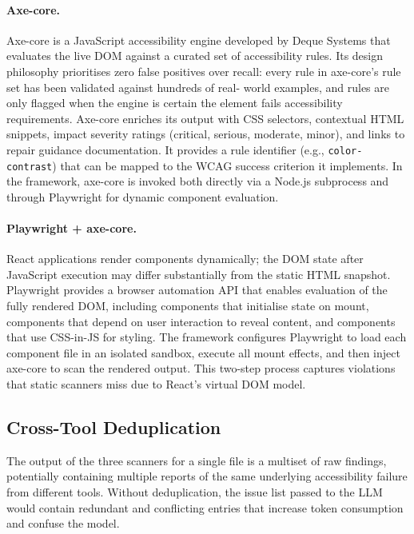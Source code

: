 \paragraph{Axe-core.}
Axe-core \cite{axe} is a JavaScript accessibility engine developed by Deque
Systems that evaluates the live DOM against a curated set of accessibility
rules.  Its design philosophy prioritises zero false positives over recall:
every rule in axe-core's rule set has been validated against hundreds of real-
world examples, and rules are only flagged when the engine is certain the
element fails accessibility requirements.  Axe-core enriches its output with
CSS selectors, contextual HTML snippets, impact severity ratings (critical,
serious, moderate, minor), and links to repair guidance documentation.  It
provides a rule identifier (e.g., \texttt{color-contrast}) that can be mapped
to the WCAG success criterion it implements.  In the framework, axe-core is
invoked both directly via a Node.js subprocess and through Playwright for
dynamic component evaluation.

\paragraph{Playwright + axe-core.}
React applications render components dynamically; the DOM state after
JavaScript execution may differ substantially from the static HTML snapshot.
Playwright \cite{playwright2023} provides a browser automation API that
enables evaluation of the fully rendered DOM, including components that
initialise state on mount, components that depend on user interaction to
reveal content, and components that use CSS-in-JS for styling.  The framework
configures Playwright to load each component file in an isolated sandbox,
execute all mount effects, and then inject axe-core to scan the rendered
output.  This two-step process captures violations that static scanners miss
due to React's virtual DOM model.

\subsection{Cross-Tool Deduplication}

The output of the three scanners for a single file is a multiset of raw
findings, potentially containing multiple reports of the same underlying
accessibility failure from different tools.  Without deduplication, the issue
list passed to the LLM would contain redundant and conflicting entries that
increase token consumption and confuse the model.

